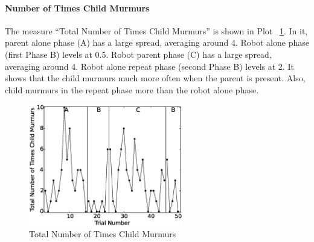 \paragraph{Number of Times Child Murmurs}
The measure ``Total Number of Times Child Murmurs'' is shown in Plot \ \ref{fig:13TotalNumberofTimesChildMurmurs}.  In it, parent alone phase (A) has a large spread, averaging around 4.  Robot alone phase (first Phase B) levels at 0.5.  Robot parent phase (C) has a large spread, averaging around 4.  Robot alone repeat phase (second Phase B) levels at 2.  It shows that the child murmurs much more often when the parent is present.  Also, child murmurs in the repeat phase more than the robot alone phase.
\begin{figure} [h]
	\centering
	\includegraphics[width=0.6\textwidth]{./img/data_analysis/13TotalNumberofTimesChildMurmurs.eps}
	\caption{Total Number of Times Child Murmurs}
	\label{fig:13TotalNumberofTimesChildMurmurs}
\end{figure}

